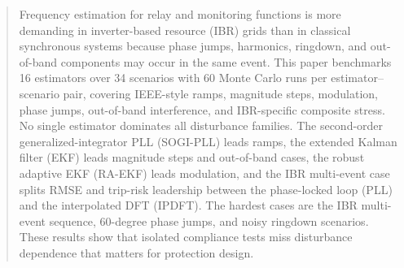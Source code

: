 \begin{abstract}
Frequency estimation for relay and monitoring functions is more demanding in
inverter-based resource (IBR) grids than in classical synchronous systems
because phase jumps, harmonics, ringdown, and out-of-band components may occur
in the same event. This paper benchmarks 16 estimators over 34 scenarios with
60 Monte Carlo runs per estimator--scenario pair, covering IEEE-style ramps,
magnitude steps, modulation, phase jumps, out-of-band interference, and
IBR-specific composite stress. No single estimator dominates all disturbance
families. The second-order generalized-integrator PLL (SOGI-PLL) leads ramps,
the extended Kalman filter (EKF) leads magnitude steps and out-of-band cases,
the robust adaptive EKF (RA-EKF) leads modulation, and the IBR multi-event case
splits RMSE and trip-risk leadership between the phase-locked loop (PLL) and
the interpolated DFT (IPDFT). The hardest cases are the IBR multi-event
sequence, 60-degree phase jumps, and noisy ringdown scenarios. These results
show that isolated compliance tests miss disturbance dependence that matters
for protection design.
\end{abstract}
